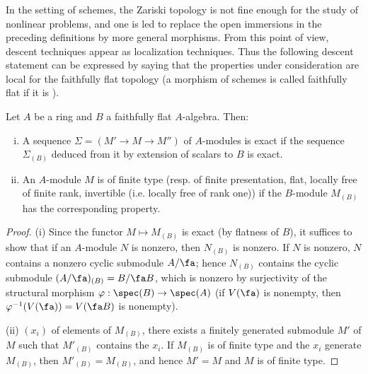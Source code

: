 \subsubsection{}\label{I:1-4-1}

In the setting of schemes, the Zariski topology is not fine enough for the
study of nonlinear problems, and one is led to replace the open immersions
in the preceding definitions by more general morphisms. From this point of
view, descent techniques appear as localization techniques. Thus the
following descent statement can be expressed by saying that the properties
under consideration are local for the faithfully flat topology (a morphism
of schemes is called faithfully flat if it is ).

\begin{proposition}\label{I:1-4-2}
Let $A$ be a ring and $B$ a faithfully flat $A$-algebra. Then:
\begin{enumerate}[(i)]
  \item A sequence $\Sigma=(M'\to M\to M'')$ of $A$-modules is exact if
    the sequence $\Sigma_{(B)}$ deduced from it by extension of scalars to
    $B$ is exact.
  \item An $A$-module $M$ is of finite type (resp. of finite presentation,
    flat, locally free of finite rank, invertible (i.e. locally free of rank
    one)) if the $B$-module $M_{(B)}$ has the corresponding property.
\end{enumerate}
\end{proposition}
\begin{proof}
(i) Since the functor $M\mapsto M_{(B)}$ is exact (by flatness of $B$),
it suffices to show that if an $A$-module $N$ is nonzero, then
$N_{(B)}$ is nonzero. If $N$ is nonzero, $N$ contains a nonzero cyclic
submodule $A/\fa$; hence $N_{(B)}$ contains the cyclic submodule
$(A/\fa)_{(B)}=B/\fa B$, which is nonzero by surjectivity of the
structural morphism $\varphi:\spec(B)\to\spec(A)$ (if $V(\fa)$ is
nonempty, then $\varphi^{-1}(V(\fa))=V(\fa B)$ is nonempty).

(ii)  $(x_i)$ of elements of $M_{(B)}$, there exists a
finitely generated submodule $M'$ of $M$ such that $M'_{(B)}$ contains
the $x_i$. If $M_{(B)}$ is of finite type and the $x_i$ generate
$M_{(B)}$, then $M'_{(B)}=M_{(B)}$, and hence $M'=M$ and $M$ is of
finite type.
\end{proof}

